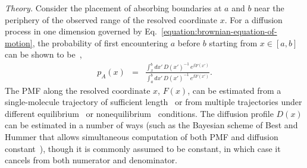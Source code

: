 \documentclass[aps,prl,twocolumn,superscriptaddress,floatfix]{revtex4-1}
\begin{document}
\noindent\emph{Theory.} 
Consider the placement of absorbing boundaries at $a$ and $b$ near the periphery of the observed range of the resolved coordinate $x$.
For a diffusion process in one dimension governed by Eq.~\ref{equation:brownian-equation-of-motion}, the probability of first encountering $a$ before $b$ starting from $x \in [a,b]$ can be shown to be~\cite{gardiner:handbook-of-stochastic-methods,rhee:jpcb:2005:splitting-probability,best-hummer:2010:pnas:coordinate-dependent-diffusion},
\color{black}
\begin{eqnarray}
p_A(x) &=& \frac{\int_{x}^{b} dx' \, D(x')^{-1} \, e^{\beta F(x')}}{\int_{a}^{b} dx' \, D(x')^{-1} \, e^{\beta F(x')}} \label{equation:splitting-probability-from-pmf} .
\end{eqnarray}
\color{black}
The PMF along the resolved coordinate $x$, $F(x)$, can be estimated from a single-molecule trajectory of sufficient length~\cite{woodside:science:2006:dna-hairpin-optical-trap,rief:2010:pnas:gcn4-pmf} or from multiple trajectories under different equilibrium~\cite{shirts-chodera:jcp:2008:mbar} or nonequilibrium~\cite{minh-adib:prl:2008:bidirectional-pulling,minh-chodera:jcp:2009:bidirectional-pulling} conditions.
\color{black}
The diffusion profile $D(x)$ can be estimated in a number of ways (such as the Bayesian scheme of Best and Hummer that allows simultaneous computation of both PMF and diffusion constant~\cite{best-hummer:2010:pnas:coordinate-dependent-diffusion}), though it is commonly assumed to be constant, in which case it cancels from both numerator and denominator.
\color{black}
\end{document}
